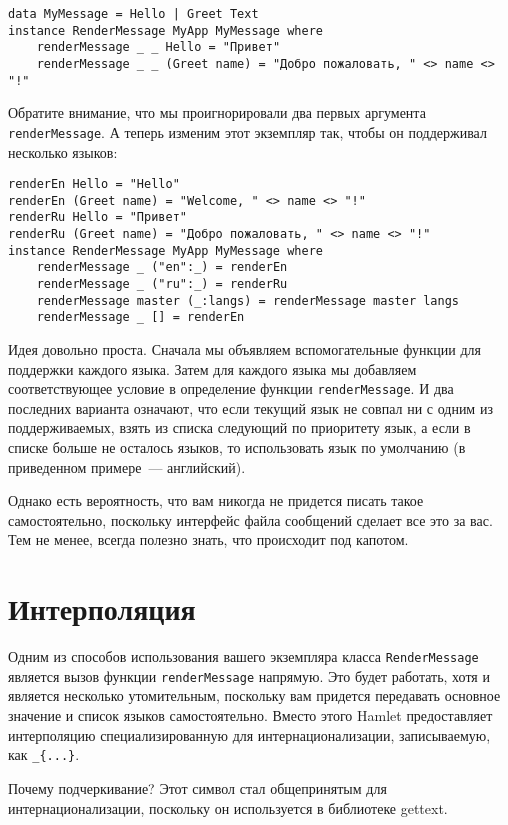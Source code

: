 \begin{lstlisting}
data MyMessage = Hello | Greet Text
instance RenderMessage MyApp MyMessage where
    renderMessage _ _ Hello = "Привет"
    renderMessage _ _ (Greet name) = "Добро пожаловать, " <> name <> "!"
\end{lstlisting}
    
Обратите внимание, что мы проигнорировали два первых аргумента
\lstinline'renderMessage'. А теперь изменим этот экземпляр так, чтобы он
поддерживал несколько языков:

\begin{lstlisting}
renderEn Hello = "Hello"
renderEn (Greet name) = "Welcome, " <> name <> "!"
renderRu Hello = "Привет"
renderRu (Greet name) = "Добро пожаловать, " <> name <> "!"
instance RenderMessage MyApp MyMessage where
    renderMessage _ ("en":_) = renderEn
    renderMessage _ ("ru":_) = renderRu
    renderMessage master (_:langs) = renderMessage master langs
    renderMessage _ [] = renderEn
\end{lstlisting}

Идея довольно проста. Сначала мы объявляем вспомогательные функции для
поддержки каждого языка. Затем для каждого языка мы добавляем соответствующее
условие в определение функции \lstinline'renderMessage'. И два последних
варианта означают, что если текущий язык не совпал ни с одним из
поддерживаемых, взять из списка следующий по приоритету язык, а если в списке
больше не осталось языков, то использовать язык по умолчанию (в приведенном
примере~--- английский).

Однако есть вероятность, что вам никогда не придется писать такое
самостоятельно, поскольку интерфейс файла сообщений сделает все это за вас. Тем
не менее, всегда полезно знать, что происходит под капотом.

\section{Интерполяция} %

Одним из способов использования вашего экземпляра класса
\lstinline'RenderMessage' является вызов функции \lstinline'renderMessage'
напрямую. Это будет работать, хотя и является несколько утомительным, поскольку
вам придется передавать основное значение и список языков самостоятельно.
Вместо этого Hamlet предоставляет интерполяцию специализированную для
интернационализации, записываемую, как \lstinline'_{...}'.

\begin{remark}
    Почему подчеркивание? Этот символ стал общепринятым для
    интернационализации, поскольку он используется в библиотеке gettext.
\end{remark}

